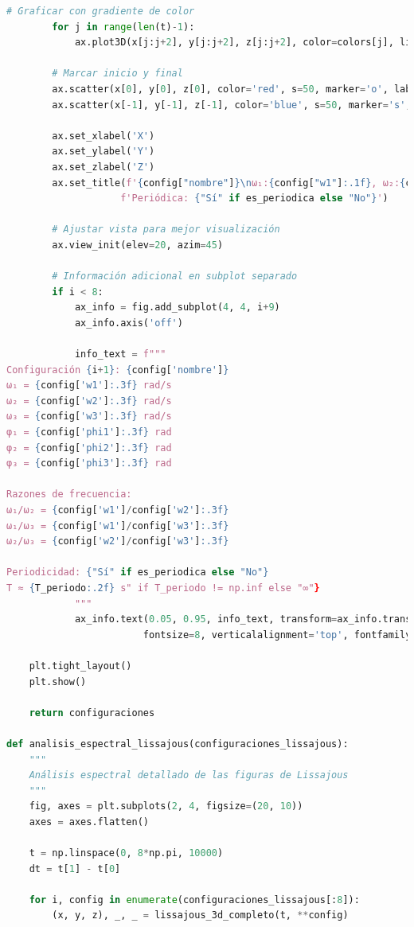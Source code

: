 \documentclass{article}
\begin{document}
\begin{lstlisting}[language=Python, caption={Análisis completo de figuras de Lissajous 3D y osciladores acoplados}]
        # Graficar con gradiente de color
        for j in range(len(t)-1):
            ax.plot3D(x[j:j+2], y[j:j+2], z[j:j+2], color=colors[j], linewidth=0.5)
        
        # Marcar inicio y final
        ax.scatter(x[0], y[0], z[0], color='red', s=50, marker='o', label='Inicio')
        ax.scatter(x[-1], y[-1], z[-1], color='blue', s=50, marker='s', label='Final')
        
        ax.set_xlabel('X')
        ax.set_ylabel('Y')
        ax.set_zlabel('Z')
        ax.set_title(f'{config["nombre"]}\nω₁:{config["w1"]:.1f}, ω₂:{config["w2"]:.1f}, ω₃:{config["w3"]:.1f}\n'
                    f'Periódica: {"Sí" if es_periodica else "No"}')
        
        # Ajustar vista para mejor visualización
        ax.view_init(elev=20, azim=45)
        
        # Información adicional en subplot separado
        if i < 8:
            ax_info = fig.add_subplot(4, 4, i+9)
            ax_info.axis('off')
            
            info_text = f"""
Configuración {i+1}: {config['nombre']}
ω₁ = {config['w1']:.3f} rad/s
ω₂ = {config['w2']:.3f} rad/s  
ω₃ = {config['w3']:.3f} rad/s
φ₁ = {config['phi1']:.3f} rad
φ₂ = {config['phi2']:.3f} rad
φ₃ = {config['phi3']:.3f} rad

Razones de frecuencia:
ω₁/ω₂ = {config['w1']/config['w2']:.3f}
ω₁/ω₃ = {config['w1']/config['w3']:.3f}
ω₂/ω₃ = {config['w2']/config['w3']:.3f}

Periodicidad: {"Sí" if es_periodica else "No"}
T ≈ {T_periodo:.2f} s" if T_periodo != np.inf else "∞"}
            """
            ax_info.text(0.05, 0.95, info_text, transform=ax_info.transAxes, 
                        fontsize=8, verticalalignment='top', fontfamily='monospace')
    
    plt.tight_layout()
    plt.show()
    
    return configuraciones

def analisis_espectral_lissajous(configuraciones_lissajous):
    """
    Análisis espectral detallado de las figuras de Lissajous
    """
    fig, axes = plt.subplots(2, 4, figsize=(20, 10))
    axes = axes.flatten()
    
    t = np.linspace(0, 8*np.pi, 10000)
    dt = t[1] - t[0]
    
    for i, config in enumerate(configuraciones_lissajous[:8]):
        (x, y, z), _, _ = lissajous_3d_completo(t, **config)
        

\end{lstlisting}
\end{document}

